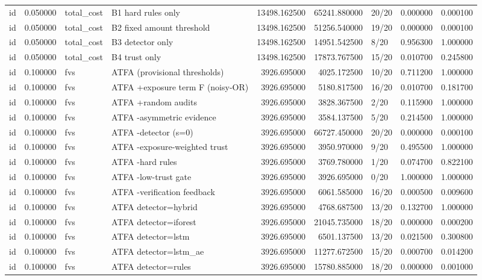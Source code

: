 \begin{tabular}{lrllrrlrr}
id & 0.050000 & total\_cost & B1 hard rules only & 13498.162500 & 65241.880000 & 20/20 & 0.000000 & 0.000100 \\
id & 0.050000 & total\_cost & B2 fixed amount threshold & 13498.162500 & 51256.540000 & 19/20 & 0.000000 & 0.000100 \\
id & 0.050000 & total\_cost & B3 detector only & 13498.162500 & 14951.542500 & 8/20 & 0.956300 & 1.000000 \\
id & 0.050000 & total\_cost & B4 trust only & 13498.162500 & 17873.767500 & 15/20 & 0.010700 & 0.245800 \\
id & 0.100000 & fvs & ATFA (provisional thresholds) & 3926.695000 & 4025.172500 & 10/20 & 0.711200 & 1.000000 \\
id & 0.100000 & fvs & ATFA +exposure term F (noisy-OR) & 3926.695000 & 5180.817500 & 16/20 & 0.010700 & 0.181700 \\
id & 0.100000 & fvs & ATFA +random audits & 3926.695000 & 3828.367500 & 2/20 & 0.115900 & 1.000000 \\
id & 0.100000 & fvs & ATFA -asymmetric evidence & 3926.695000 & 3584.137500 & 5/20 & 0.214500 & 1.000000 \\
id & 0.100000 & fvs & ATFA -detector (s=0) & 3926.695000 & 66727.450000 & 20/20 & 0.000000 & 0.000100 \\
id & 0.100000 & fvs & ATFA -exposure-weighted trust & 3926.695000 & 3950.970000 & 9/20 & 0.495500 & 1.000000 \\
id & 0.100000 & fvs & ATFA -hard rules & 3926.695000 & 3769.780000 & 1/20 & 0.074700 & 0.822100 \\
id & 0.100000 & fvs & ATFA -low-trust gate & 3926.695000 & 3926.695000 & 0/20 & 1.000000 & 1.000000 \\
id & 0.100000 & fvs & ATFA -verification feedback & 3926.695000 & 6061.585000 & 16/20 & 0.000500 & 0.009600 \\
id & 0.100000 & fvs & ATFA detector=hybrid & 3926.695000 & 4768.687500 & 13/20 & 0.132700 & 1.000000 \\
id & 0.100000 & fvs & ATFA detector=iforest & 3926.695000 & 21045.735000 & 18/20 & 0.000000 & 0.000200 \\
id & 0.100000 & fvs & ATFA detector=lstm & 3926.695000 & 6501.137500 & 13/20 & 0.021500 & 0.300800 \\
id & 0.100000 & fvs & ATFA detector=lstm\_ae & 3926.695000 & 11277.672500 & 15/20 & 0.000700 & 0.014200 \\
id & 0.100000 & fvs & ATFA detector=rules & 3926.695000 & 15780.885000 & 18/20 & 0.000000 & 0.001000 \\

\end{tabular}
